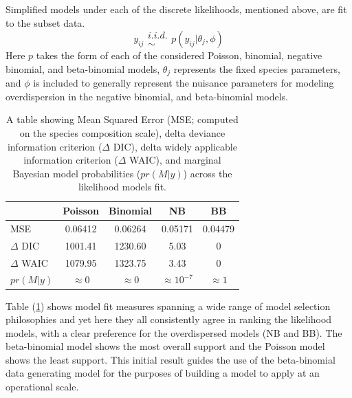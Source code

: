 \documentclass[12pt]{article}
\begin{document}
Simplified models under each of the discrete likelihoods, mentioned
above, are fit to the subset data.
\[y_{ij}\substack{i.i.d.\\\sim} p(y_{ij}|\theta_j, \phi)\]
Here \(p\) takes the form of each of the considered Poisson, binomial,
negative binomial, and beta-binomial models, \(\theta_j\) represents the
fixed species parameters, and \(\phi\) is included to generally
represent the nuisance parameters for modeling overdispersion in the
negative binomial, and beta-binomial models.

\begin{table}[h!]
\centering
\begin{tabular}[c]{@{}lcccc@{}}
\hline
& Poisson & Binomial & NB & BB \\ \hline
MSE & 0.06412 & 0.06264 & 0.05171 & 0.04479 \\ 
\(\Delta\) DIC & 1001.41 & 1230.60 & 5.03 & 0 \\
\(\Delta\) WAIC & 1079.95 & 1323.75 & 3.43 & 0 \\
\(pr(M|y)\) & \(\approx0\) & \(\approx0\) & \(\approx10^{-7}\) & \(\approx1\) \\ \hline
\end{tabular}
\caption{A table showing Mean Squared Error (MSE; computed on the species 
composition scale), delta deviance information criterion (\(\Delta\) DIC), 
delta widely applicable information criterion (\(\Delta\) WAIC), and marginal 
Bayesian model probabilities (\(pr(M|y)\)) across the likelihood models fit.}
\label{likeTab}
\end{table}


Table (\ref{likeTab}) shows model fit measures spanning a wide range of model
selection philosophies and yet here they all consistently agree in ranking the 
likelihood models, with a clear preference for the overdispersed models (NB 
and BB). The beta-binomial model shows the most overall support and the Poisson 
model shows the least support. This initial result guides the use of the 
beta-binomial data generating model for the purposes of building a model to 
apply at an operational scale.
\end{document}
